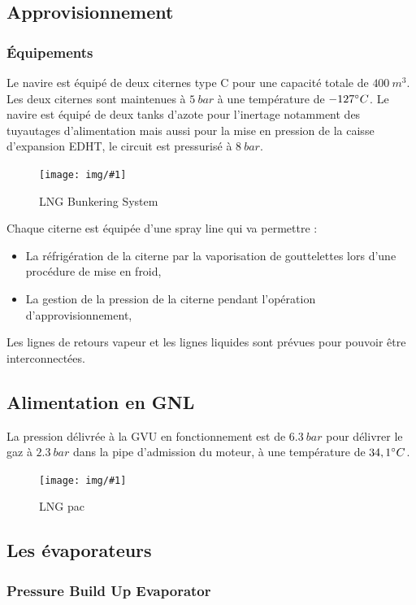 \documentclass[12pt,a4paper]{article}
\newcommand{\image}[3]
 {\begin{figure}[H]
         \begin{center}
          \texttt{[image: img/\#1]}
          \caption{#2} \label{img_#1}
         \end{center}
  \end{figure}
}
\begin{document}
\subsection{Approvisionnement}

\subsubsection{Équipements}

Le navire est équipé de deux citernes type C pour une capacité totale de $400 ~m^3$. Les deux citernes sont maintenues à $5~bar$ à une température de $-127 \degree C$. Le navire est équipé de deux tanks d'azote pour l'inertage notamment des tuyautages d'alimentation mais aussi pour la mise en pression de la caisse d'expansion EDHT, le circuit est pressurisé à $8~bar$.

\image{BS}{LNG Bunkering System}{0.6}

Chaque citerne est équipée d'une spray line qui va permettre :

\begin{itemize}
 \item La réfrigération de la citerne par la vaporisation de gouttelettes lors d'une procédure de mise en froid,
 \item La gestion de la pression de la citerne pendant l'opération d'approvisionnement,
\end{itemize}

Les lignes de retours vapeur et les lignes liquides sont prévues pour pouvoir 
être interconnectées.

\subsection{Alimentation en GNL}

La pression délivrée à la GVU en fonctionnement est de $6.3~ bar$ pour délivrer le gaz à $2.3~ bar$ dans la pipe d'admission du moteur, à une température de $34,1 \degree C$.

\image{LNGPAC}{LNG pac}{0.6}
\subsection{Les évaporateurs}

\subsubsection{Pressure Build Up Evaporator}
\end{document}
